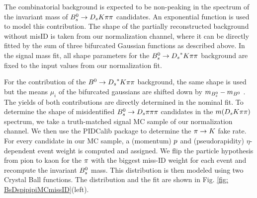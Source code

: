 The combinatorial background is expected to be non-peaking in the spectrum of the invariant mass of ${{B}^0_{s}}\rightarrow{\ensuremath{{D}_{s}}}{\ensuremath{K}}{\ensuremath{\pi}}{\ensuremath{\pi}}$ candidates. An exponential function is used to model this contribution.\newline
The shape of the partially reconstructed background without misID is taken from our normalization channel, where it can be directly fitted by the sum of three bifurcated Gaussian functions as described above.
In the signal mass fit, all shape parameters for the ${{B}^0_{s}}\rightarrow{\ensuremath{{D}_{s}}}^{*}{K}{\pi}{\pi}$ background are fixed to the input values from our normalization fit.  


For the contribution of the ${{B}^0}\rightarrow{\ensuremath{{D}_{s}}}^{*}{K}{\pi}{\pi}$ background, the same shape is used but the means $\mu_{i}$ of the bifurcated gaussians are shifted down by $m_{{{B}^0_{s}}} - m_{{{B}^0}}$ \cite{Agashe:2014kda}. 
The yields of both contributions are directly determined in the nominal fit. \newline
To determine the shape of misidentified ${{B}^0_{s}}\rightarrow{\ensuremath{{D}_{s}}}{\ensuremath{\pi}}{\ensuremath{\pi}}{\ensuremath{\pi}}$ candidates in the $m({{D}_{s}}{K}{\pi}{\pi})$ spectrum, we take a truth-matched signal MC sample of our normalization channel. 
We then use the PIDCalib package to determine the ${\pi}\rightarrow{\ensuremath{K}}$ fake rate. For every candidate in our MC sample, a (momentum) $\mbox{$p$}$ and (pseudorapidity) $\eta$-dependent event weight is computed and assigned. 
We flip the particle hypothesis from pion to kaon for the ${\pi}$ with the biggest miss-ID weight for each event and recompute the invariant ${{B}^0_{s}}$ mass. This distribution is then modeled using two Crystal Ball functions. 
The distribution and the fit are shown in Fig. \ref{fig: BsDspipipiMCmissID}(left). 

